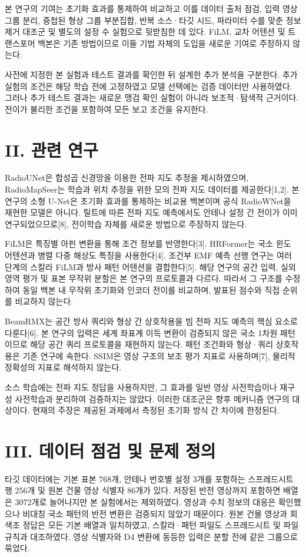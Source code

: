 \documentclass[10pt,a4paper]{article}
\begin{document}
본 연구의 기여는 초기화 효과를 통제하여 비교하고 이를 데이터 출처 점검, 입력 영상 그룹 분리, 중첩된 형상 그룹 부분집합, 반복 소스·타깃 시드, 파라미터 수를 맞춘 정보 제거 대조군 및 별도의 설정 수 실험으로 뒷받침한 데 있다. FiLM, 교차 어텐션 및 트랜스포머 백본은 기존 방법이므로 이들 기법 자체의 도입을 새로운 기여로 주장하지 않는다.

사전에 지정한 본 실험과 테스트 결과를 확인한 뒤 설계한 추가 분석을 구분한다. 추가 실험의 조건은 해당 학습 전에 고정하였고 모델 선택에는 검증 데이터만 사용하였다. 그러나 추가 테스트 결과는 새로운 맹검 확인 실험이 아니라 보조적·탐색적 근거이다. 전이가 불리한 조건을 포함하여 모든 보고 조건을 유지한다.

\section*{II. 관련 연구}
RadioUNet은 합성곱 신경망을 이용한 전파 지도 추정을 제시하였으며, RadioMapSeer는 학습과 위치 추정을 위한 모의 전파 지도 데이터를 제공한다[1,2]. 본 연구의 소형 U-Net은 초기화 효과를 통제하는 비교용 백본이며 공식 RadioWNet을 재현한 모델은 아니다. 틸트에 따른 전파 지도 예측에서도 안테나 설정 간 전이가 이미 연구되었으므로[8], 전이학습 자체를 새로운 방법으로 주장하지 않는다.

FiLM은 특징별 아핀 변환을 통해 조건 정보를 반영한다[3]. HRFormer는 국소 윈도 어텐션과 병렬 다중 해상도 특징을 사용한다[4]. 조건부 EMF 예측 선행 연구는 여러 단계의 스칼라 FiLM과 방사 패턴 어텐션을 결합한다[5]. 해당 연구의 공간 입력, 실외 영역 평가 및 표본 무작위 분할은 본 연구의 프로토콜과 다르다. 따라서 그 구조를 수정하여 동일 백본 내 무작위 초기화와 인코더 전이를 비교하며, 발표된 점수와 직접 순위를 비교하지 않는다.

BeamRMX는 공간 방사 쿼리와 형상 간 상호작용을 빔 전파 지도 예측의 핵심 요소로 다룬다[6]. 본 연구의 입력은 세계 좌표계 이득 변환이 검증되지 않은 국소 1차원 패턴이므로 해당 공간 쿼리 프로토콜을 재현하지 않는다. 패턴 조건화와 형상·쿼리 상호작용은 기존 연구에 속한다. SSIM은 영상 구조의 보조 평가 지표로 사용하며[7], 물리적 정확성의 지표로 해석하지 않는다.

소스 학습에는 전파 지도 정답을 사용하지만, 그 효과를 일반 영상 사전학습이나 재구성 사전학습과 분리하여 검증하지는 않았다. 이러한 대조군은 향후 메커니즘 연구의 대상이다. 현재의 주장은 제공된 과제에서 측정된 초기화 방식 간 차이에 한정된다.

\section*{III. 데이터 점검 및 문제 정의}
타깃 데이터에는 기본 표본 768개, 안테나 번호별 설정 3개를 포함하는 스프레드시트 행 256개 및 원본 건물 영상 식별자 86개가 있다. 저장된 반전 영상까지 포함하면 배열은 3072개로 늘어나지만 본 실험에서는 제외하였다. 영상과 수치 정보의 대응은 확인했으나 비대칭 국소 패턴의 반전 변환은 검증되지 않았기 때문이다. 원본 건물 영상과 회색조 정답은 모든 기본 배열과 일치하였고, 스칼라·패턴 파일도 스프레드시트 및 파일 규칙과 대조하였다. 영상 식별자와 D4 변환에 동등한 입력은 분할 전에 같은 그룹으로 묶었다.
\end{document}
